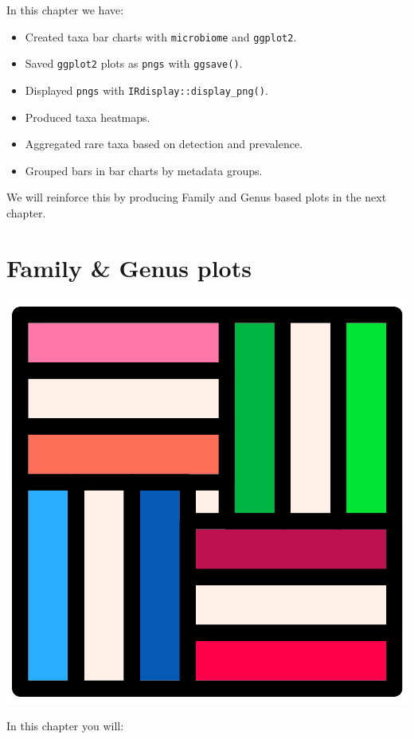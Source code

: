 \documentclass[
]{book}
\providecommand{\tightlist}{%
  \setlength{\itemsep}{0pt}\setlength{\parskip}{0pt}}
\begin{document}
In this chapter we have:

\begin{itemize}
\tightlist
\item
  Created taxa bar charts with \texttt{microbiome} and \texttt{ggplot2}.
\item
  Saved \texttt{ggplot2} plots as \texttt{pngs} with \texttt{ggsave()}.
\item
  Displayed \texttt{pngs} with \texttt{IRdisplay::display\_png()}.
\item
  Produced taxa heatmaps.
\item
  Aggregated rare taxa based on detection and prevalence.
\item
  Grouped bars in bar charts by metadata groups.
\end{itemize}

We will reinforce this by producing Family and Genus based plots in the next chapter.

\hypertarget{family_genus_chap}{%
\chapter{Family \& Genus plots}\label{family_genus_chap}}

\includegraphics{figures/plots.png}

In this chapter you will:
\end{document}

